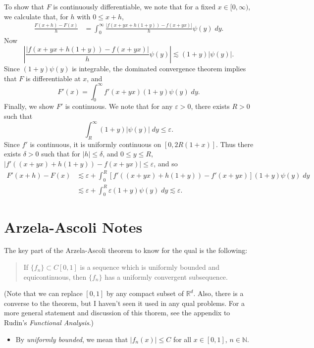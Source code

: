\documentclass[answers]{exam}
\theoremstyle{problemstyle}
\newcommand{\1}[1]{\textbf{1}_{\left[#1\right]}} %
\def\R{\mathbb{R}} %
\begin{document}
\begin{questions}
\begin{solution}
    To show that $F$ is continuously differentiable, we note that for a fixed $x \in [0,\infty)$, we calculate that, for $h$ with $0 \leq x + h$,
    \begin{align*}
        \frac{F(x+h) - F(x)}{h} &= \int_0^\infty \frac{|f(x+yx + h(1 + y)) - f(x + yx)|}{h} \psi(y)\; dy.
    \end{align*}
    Now
    \[ \left| \frac{|f(x+yx + h(1 + y)) - f(x + yx)|}{h} \psi(y) \right| \lesssim (1 + y) |\psi(y)|. \]
    Since $(1 + y) \psi(y)$ is integrable, the dominated convergence theorem implies that $F$ is differentiable at $x$, and
    \[ F'(x) = \int_0^\infty f'(x + yx) (1 + y) \psi(y)\; dy. \]
    Finally, we show $F'$ is continuous. We note that for any $\varepsilon > 0$, there exists $R > 0$ such that
    \[ \int_R^\infty (1 + y) |\psi(y)|\; dy \leq \varepsilon. \]
    Since $f'$ is continuous, it is uniformly continuous on $[0,2R(1 + x)]$. Thus there exists $\delta > 0$ such that for $|h| \leq \delta$, and $0 \leq y \leq R$, $|f'((x + yx) + h(1 + y)) - f(x + yx)| \leq \varepsilon$, and so
    \begin{align*}
        F'(x+h) - F(x) &\lesssim \varepsilon + \int_0^R [f'((x + yx) + h(1 + y)) - f'(x + yx)] (1 + y) \psi(y)\; dy\\
        &\lesssim \varepsilon + \int_0^R \varepsilon (1 + y) \psi(y)\; dy \lesssim \varepsilon.
    \end{align*}
\end{solution}




\newpage
\section{Arzela-Ascoli Notes}

The key part of the Arzela-Ascoli theorem to know for the qual is the following: 

\begin{quote}
If $\{f_n\}\subset C[0,1]$ is a sequence which is uniformly bounded and equicontinuous, then $\{f_n\}$ has a uniformly convergent subsequence.
\end{quote} 

(Note that we can replace $[0,1]$ by any compact subset of $\R^d$. Also, there is a converse to the theorem, but I haven't seen it used in any qual problems. For a more general statement and discussion of this thorem, see the appendix to Rudin's \textit{Functional Analysis}.)
\begin{itemize}
\item By \textit{uniformly bounded}, we mean that $|f_n(x)|\leq C$ for all $x\in [0,1]$, $n\in \mathbb{N}$.


\end{itemize}
\end{questions}
\end{document}
